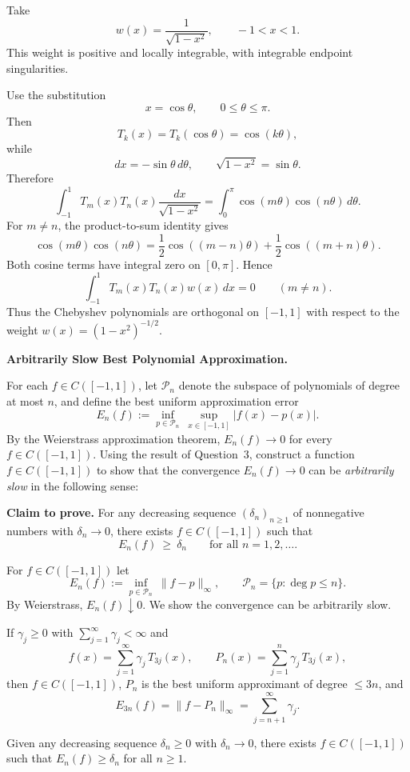 \begin{solution}
Take
\[
\boxed{w(x)=\frac{1}{\sqrt{1-x^2}}},\qquad -1<x<1.
\]
This weight is positive and locally integrable, with integrable endpoint
singularities.

Use the substitution
\[
x=\cos\theta,\qquad 0\le\theta\le\pi.
\]
Then
\[
T_k(x)=T_k(\cos\theta)=\cos(k\theta),
\]
while
\[
dx=-\sin\theta\,d\theta,
\qquad
\sqrt{1-x^2}=\sin\theta.
\]
Therefore
\[
\int_{-1}^{1}
T_m(x)T_n(x)\frac{dx}{\sqrt{1-x^2}}
=
\int_0^\pi
\cos(m\theta)\cos(n\theta)\,d\theta.
\]
For \(m\ne n\), the product-to-sum identity gives
\[
\cos(m\theta)\cos(n\theta)
=
\frac12\cos((m-n)\theta)
+
\frac12\cos((m+n)\theta).
\]
Both cosine terms have integral zero on \([0,\pi]\). Hence
\[
\boxed{
\int_{-1}^{1}
T_m(x)T_n(x)w(x)\,dx=0
\qquad(m\ne n).
}
\]
Thus the Chebyshev polynomials are orthogonal on \([-1,1]\) with respect to the
weight \(w(x)=(1-x^2)^{-1/2}\).
\end{solution}

\begin{problem}[CP-II-0217]
\label{prob:cp-ii-0217}
\textbf{Arbitrarily Slow Best Polynomial Approximation.}

\hspace*{1.5em}For each \(f\in C([-1,1])\), let \(\mathcal P_n\) denote the subspace of polynomials of degree
at most \(n\), and define the best uniform approximation error
\[
E_n(f):=\inf_{p\in \mathcal P_n}\ \sup_{x\in[-1,1]} |f(x)-p(x)|.
\]
By the Weierstrass approximation theorem, \(E_n(f)\to 0\) for every \(f\in C([-1,1])\).
Using the result of Question~3, construct a function \(f\in C([-1,1])\) to show that the
convergence \(E_n(f)\to 0\) can be \emph{arbitrarily slow} in the following sense:

\medskip
\noindent
\textbf{Claim to prove.} For any decreasing sequence \((\delta_n)_{n\ge1}\) of nonnegative numbers with
\(\delta_n\to 0\), there exists \(f\in C([-1,1])\) such that
\[
E_n(f)\ \ge\ \delta_n \qquad\text{for all } n=1,2,\dots.
\]

For \(f\in C([-1,1])\) let
\[
E_n(f):=\inf_{p\in\mathcal P_n}\ \|f-p\|_\infty,\qquad
\mathcal P_n=\{p:\deg p\le n\}.
\]
By Weierstrass, \(E_n(f)\downarrow 0\). We show the convergence can be arbitrarily slow.

If \(\gamma_j\ge0\) with \(\sum_{j=1}^\infty\gamma_j<\infty\) and
\[
f(x)=\sum_{j=1}^\infty \gamma_j\,T_{3j}(x),\qquad
P_n(x)=\sum_{j=1}^{n}\gamma_j\,T_{3j}(x),
\]
then \(f\in C([-1,1])\), \(P_n\) is the best uniform approximant of degree \(\le 3n\), and
\[
E_{3n}(f)=\|f-P_n\|_\infty=\sum_{j=n+1}^\infty \gamma_j.
\]

Given any decreasing sequence \(\delta_n\ge0\) with \(\delta_n\to 0\), there exists
\(f\in C([-1,1])\) such that \(E_n(f)\ge \delta_n\) for all \(n\ge1\).
\end{problem}

